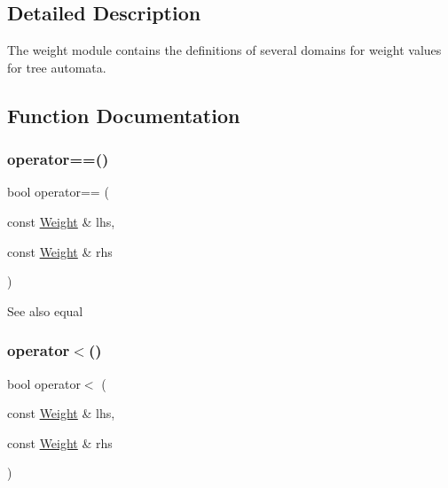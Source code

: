 \subsection{Detailed Description}
The {\ttfamily weight} module contains the definitions of several domains for weight values for tree automata. 



\subsection{Function Documentation}
\mbox{\label{group__weight_ga985964770c3e3b3aea4ea1ebd817f1c8}} 
\subsubsection{\texorpdfstring{operator==()}{operator==()}}
{\footnotesize\ttfamily bool operator== (\begin{DoxyParamCaption}\item[{const \mbox{\hyperlink{classWeight}{Weight}} \&}]{lhs,  }\item[{const \mbox{\hyperlink{classWeight}{Weight}} \&}]{rhs }\end{DoxyParamCaption})\hspace{0.3cm}{\ttfamily [inline]}}

\begin{DoxySeeAlso}{See also}
equal 
\end{DoxySeeAlso}
\mbox{\label{group__weight_gaf058ecdf4336e4dff64400d149c791f9}} 
\subsubsection{\texorpdfstring{operator$<$()}{operator<()}}
{\footnotesize\ttfamily bool operator$<$ (\begin{DoxyParamCaption}\item[{const \mbox{\hyperlink{classWeight}{Weight}} \&}]{lhs,  }\item[{const \mbox{\hyperlink{classWeight}{Weight}} \&}]{rhs }\end{DoxyParamCaption})\hspace{0.3cm}{\ttfamily [inline]}}

